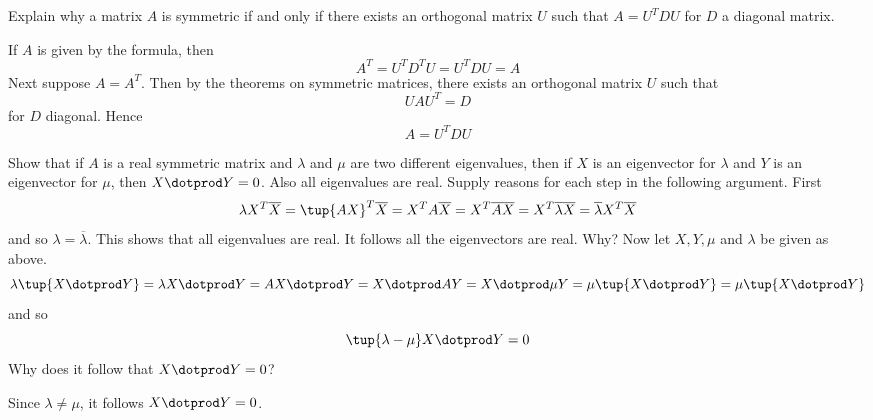 \begin{enumialphparenastyle}
\begin{ex} Explain why a matrix $A$ is symmetric if and only if there exists an
orthogonal matrix $U$ such that $A=U^{T}DU$ for $D$ a diagonal matrix.
\begin{sol}
If $A$ is given by the formula, then
\[
A^{T}=U^{T}D^{T}U=U^{T}DU=A
\]
Next suppose $A=A^{T}$. Then by the theorems on symmetric matrices, there
exists an orthogonal matrix $U$ such that
\[
UAU^{T}=D
\]
for $D$ diagonal. Hence
\[
A=U^{T}DU
\]
\end{sol}
\end{ex}

\begin{ex} Show that if $A$ is a real symmetric matrix and 
$\lambda $ and $\mu $ are two different eigenvalues, then if $X$ is
an eigenvector for $\lambda $ and $Y$ is an eigenvector for $\mu $,
then $X\dotprod Y=0$. Also all eigenvalues are real. Supply reasons
for each step in the following argument. First 
\begin{equation*}
\lambda X^{T}\overline{X}=\tup{AX} ^{T}
\overline{X}=X^{T}A\overline{X}=X^{T}
\overline{AX}=X^{T}\overline{\lambda }\overline{X}
=\overline{\lambda }X^{T}\overline{X}
\end{equation*}
and so $\lambda =\overline{\lambda }$. This shows that all eigenvalues are
real. It follows all the eigenvectors are real. Why? Now let $X,Y
,\mu $ and $\lambda $ be given as above. \ 
\begin{equation*}
\lambda \tup{X\dotprod Y} =\lambda X\dotprod Y=AX\dotprod Y=X\dotprod AY=X\dotprod \mu Y=\mu \tup{
X\dotprod Y} =\mu \tup{X\dotprod Y}
\end{equation*}
and so 
\begin{equation*}
\tup{\lambda -\mu } X\dotprod Y=0
\end{equation*}
Why does it follow that $X\dotprod Y=0$?
\begin{sol}
Since $\lambda \neq \mu $, it follows $X \dotprod Y =0$.
\end{sol}
\end{ex}

\end{enumialphparenastyle}